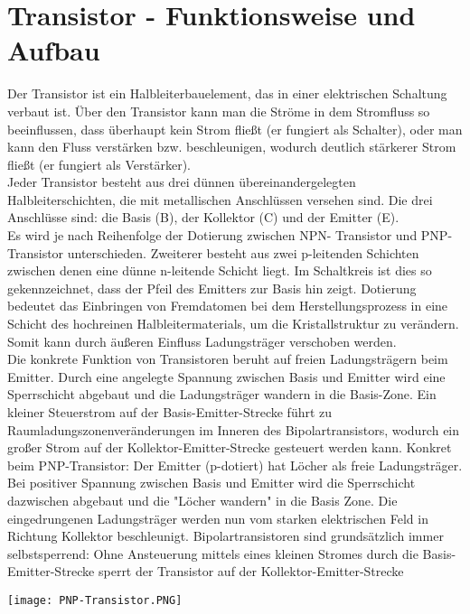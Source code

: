 \section{Transistor - Funktionsweise und Aufbau}
Der Transistor ist ein Halbleiterbauelement, das in einer elektrischen Schaltung verbaut ist.
Über den Transistor kann man die Ströme in dem Stromfluss so beeinflussen, dass überhaupt
kein Strom fließt (er fungiert als Schalter), oder man kann den Fluss verstärken bzw.
beschleunigen, wodurch deutlich stärkerer Strom fließt (er fungiert als Verstärker).\\
Jeder Transistor besteht aus drei dünnen übereinandergelegten Halbleiterschichten, die mit
metallischen Anschlüssen versehen sind. Die drei Anschlüsse sind: die Basis (B), der Kollektor
(C) und der Emitter (E).\\
Es wird je nach Reihenfolge der Dotierung zwischen NPN- Transistor und PNP-Transistor
unterschieden. Zweiterer besteht aus zwei p-leitenden Schichten zwischen denen eine dünne
n-leitende Schicht liegt. Im Schaltkreis ist dies so gekennzeichnet, dass der Pfeil des Emitters
zur Basis hin zeigt. 
Dotierung bedeutet das Einbringen von Fremdatomen bei dem Herstellungsprozess in eine Schicht des hochreinen Halbleitermaterials, um die Kristallstruktur zu verändern. Somit kann durch äußeren Einfluss Ladungsträger verschoben werden.\\
Die konkrete Funktion von Transistoren beruht auf freien Ladungsträgern beim Emitter. Durch
eine angelegte Spannung zwischen Basis und Emitter wird eine Sperrschicht abgebaut und die
Ladungsträger wandern in die Basis-Zone. Ein kleiner Steuerstrom auf der
Basis-Emitter-Strecke führt zu Raumladungszonenveränderungen im Inneren des
Bipolartransistors, wodurch ein großer Strom auf der Kollektor-Emitter-Strecke gesteuert
werden kann. Konkret beim PNP-Transistor: Der Emitter (p-dotiert) hat Löcher als freie Ladungsträger. Bei positiver Spannung zwischen Basis und Emitter wird die Sperrschicht dazwischen abgebaut und die "Löcher wandern" in die Basis Zone. Die eingedrungenen Ladungsträger werden nun vom starken elektrischen Feld in Richtung Kollektor beschleunigt.
Bipolartransistoren sind grundsätzlich immer selbstsperrend: Ohne Ansteuerung mittels eines
kleinen Stromes durch die Basis-Emitter-Strecke sperrt der Transistor auf der
Kollektor-Emitter-Strecke\\
\begin{center}
    \texttt{[image: PNP-Transistor.PNG]}
\end{center}
